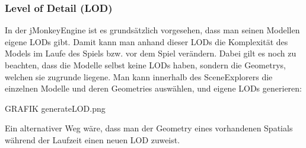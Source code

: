 \subsubsection{Level of Detail (LOD)}
In der jMonkeyEngine ist es grundsätzlich vorgesehen, dass man seinen Modellen eigene LODs gibt. Damit kann man anhand dieser LODs die Komplexität des Models im Laufe des Spiels bzw. vor dem Spiel verändern. Dabei gilt es noch zu beachten, dass die Modelle selbst keine LODs haben, sondern die Geometrys, welchen sie zugrunde liegene. Man kann innerhalb des SceneExplorers die einzelnen Modelle und deren Geometries auswählen, und eigene LODs generieren:

GRAFIK generateLOD.png

Ein alternativer Weg wäre, dass man der Geometry eines vorhandenen Spatials während der Laufzeit einen neuen LOD zuweist. 



